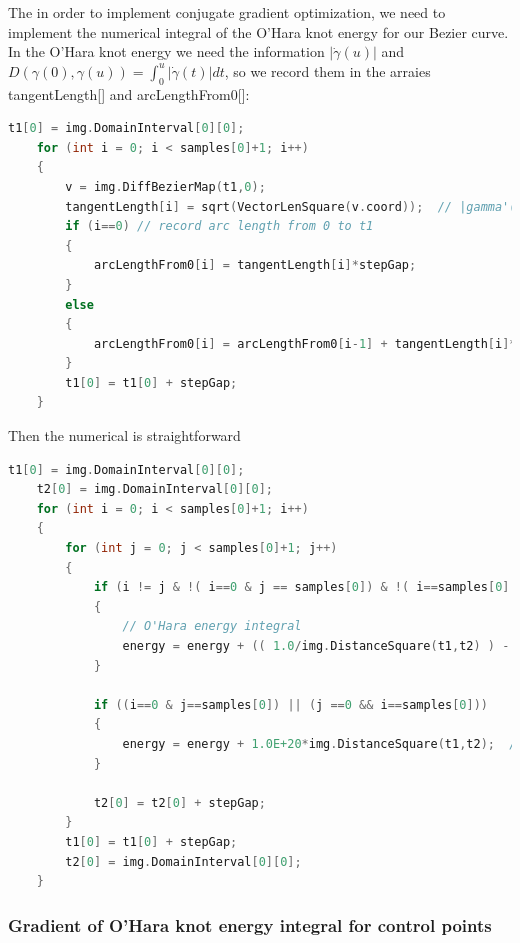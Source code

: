 \documentclass[12pt]{article}
\begin{document}
The in order to implement conjugate gradient optimization, we need to implement the numerical integral of the O'Hara knot energy for our Bezier curve.
In the O'Hara knot energy we need the information $|\dot{\gamma}(u)|$ and $D(\gamma (0),\gamma (u)) = \int_0^u |\dot{\gamma}(t)|dt$, so we record them in the arraies \textsf{tangentLength[]} and \textsf{arcLengthFrom0[]}:
%
\begin{lstlisting}[language=c++]
	t1[0] = img.DomainInterval[0][0];
	for (int i = 0; i < samples[0]+1; i++)
	{
		v = img.DiffBezierMap(t1,0);
		tangentLength[i] = sqrt(VectorLenSquare(v.coord));  // |gamma'(t1)|
		if (i==0) // record arc length from 0 to t1
		{
			arcLengthFrom0[i] = tangentLength[i]*stepGap;
		}
		else
		{
			arcLengthFrom0[i] = arcLengthFrom0[i-1] + tangentLength[i]*stepGap;
		}
		t1[0] = t1[0] + stepGap;
	}
\end{lstlisting}
%
Then the numerical is straightforward
%
\begin{lstlisting}[language=c++]
	t1[0] = img.DomainInterval[0][0];
	t2[0] = img.DomainInterval[0][0];
	for (int i = 0; i < samples[0]+1; i++)
	{
		for (int j = 0; j < samples[0]+1; j++)
		{
			if (i != j & !( i==0 & j == samples[0]) & !( i==samples[0] & j == 0))
			{
				// O'Hara energy integral
				energy = energy + (( 1.0/img.DistanceSquare(t1,t2) ) - ( 1.0/pow(std::min(abs(arcLengthFrom0[i]-arcLengthFrom0[j]),arcLengthFrom0[samples[0]]-abs(arcLengthFrom0[i]-arcLengthFrom0[j])), 2) )) * tangentLength[i] * tangentLength[j];                        
			}

			if ((i==0 & j==samples[0]) || (j ==0 && i==samples[0]))
			{
				energy = energy + 1.0E+20*img.DistanceSquare(t1,t2);  // inforce the start point and end point can not change too much.
			}

			t2[0] = t2[0] + stepGap;
		}
		t1[0] = t1[0] + stepGap;
		t2[0] = img.DomainInterval[0][0];
	}
\end{lstlisting}





\subsubsection{Gradient of O'Hara knot energy integral for control points}
\end{document}
